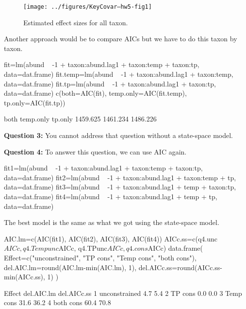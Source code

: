 \begin{figure}[htp]
\label{fig:q5.effects}
\begin{center}
\texttt{[image: ../figures/KeyCovar--hw5-fig1]}
\end{center}
\caption{Estimated effect sizes for all taxon.}
\end{figure}

Another approach would be to compare AICs but we have to do this taxon by taxon.
\begin{Schunk}
\begin{Sinput}
   fit=lm(abund ~ -1 + taxon:abund.lag1 + taxon:temp + taxon:tp,
          data=dat.frame)
   fit.temp=lm(abund ~ -1 + taxon:abund.lag1 + taxon:temp,
          data=dat.frame)
   fit.tp=lm(abund ~ -1 + taxon:abund.lag1 + taxon:tp,
          data=dat.frame)
   c(both=AIC(fit), temp.only=AIC(fit.temp), tp.only=AIC(fit.tp))
\end{Sinput}
\begin{Soutput}
     both temp.only   tp.only 
 1459.625  1461.234  1486.226 
\end{Soutput}
\end{Schunk}

\bigskip
{\bf Question 3:} You cannot address that question without a state-space model.

\bigskip
{\bf Question 4:} To answer this question, we can use AIC again.

\begin{Schunk}
\begin{Sinput}
   fit1=lm(abund ~ -1 + taxon:abund.lag1 + taxon:temp + taxon:tp,
          data=dat.frame)
   fit2=lm(abund ~ -1 + taxon:abund.lag1 + taxon:temp + tp,
          data=dat.frame)
   fit3=lm(abund ~ -1 + taxon:abund.lag1 + temp + taxon:tp,
          data=dat.frame)
   fit4=lm(abund ~ -1 + taxon:abund.lag1 + temp + tp,
          data=dat.frame)
\end{Sinput}
\end{Schunk}


The best model is the same as what we got using the state-space model.

\begin{Schunk}
\begin{Sinput}
 	AIC.lm=c(AIC(fit1), AIC(fit2),
 		                AIC(fit3), AIC(fit4))
   AICc.ss=c(q4.unc$AICc, q4.Tempunc$AICc,
 		                q4.TPunc$AICc, q4.cons$AICc)
   data.frame(
   Effect=c("unconstrained", "TP cons", "Temp cons", "both cons"),
 	del.AIC.lm=round(AIC.lm-min(AIC.lm), 1),
 	del.AICc.ss=round(AICc.ss-min(AICc.ss), 1)
 )
\end{Sinput}
\begin{Soutput}
         Effect del.AIC.lm del.AICc.ss
1 unconstrained        4.7         5.4
2       TP cons        0.0         0.0
3     Temp cons       31.6        36.2
4     both cons       60.4        70.8
\end{Soutput}
\end{Schunk}

